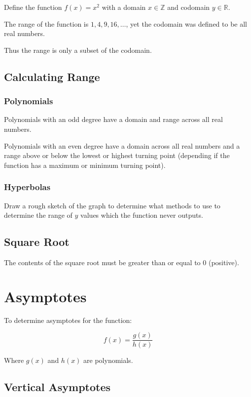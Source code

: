 \documentclass[a4paper,11pt]{article}
\begin{document}
Define the function $f(x) = x^2$ with a domain $x \in \mathbb{Z}$ and codomain
$y \in \mathbb{R}$.

The range of the function is ${1, 4, 9, 16, \ldots}$, yet the codomain was
defined to be all real numbers.

Thus the range is only a subset of the codomain.


\subsection{Calculating Range}

\subsubsection{Polynomials}

Polynomials with an odd degree have a domain and range across all real numbers.

Polynomials with an even degree have a domain across all real numbers and a
range above or below the lowest or highest turning point (depending if the
function has a maximum or minimum turning point).


\subsubsection{Hyperbolas}

Draw a rough sketch of the graph to determine what methods to use to determine
the range of $y$ values which the function never outputs.


\subsection{Square Root}

The contents of the square root must be greater than or equal to 0 (positive).




\section{Asymptotes}

To determine asymptotes for the function:

$$
f(x) = \frac{g(x)}{h(x)}
$$

Where $g(x)$ and $h(x)$ are polynomials.


\subsection{Vertical Asymptotes}
\end{document}
